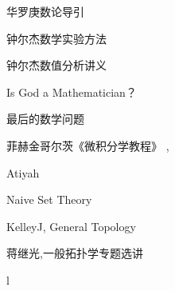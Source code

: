 \documentclass[main.tex]{subfiles}
\begin{document}
华罗庚数论导引
\cite[p.~1]{HuaL}

钟尔杰数学实验方法 \cite{ZhongEr1}

钟尔杰数值分析讲义 \cite{ZhongEr2}

Is God a Mathematician？\cite{LivioM}

最后的数学问题 \cite{LivioM2}

菲赫金哥尔茨《微积分学教程》\cite{FeiH1}
\cite{FeiH2}, \cite{FeiH3}

Atiyah \cite{AM69}

Naive Set Theory \cite{HalmosP}

KelleyJ, General Topology \cite{KelleyJ}
	
蒋继光,一般拓扑学专题选讲\cite{JiangJi}

l\cite{derWaerden}
\end{document}
